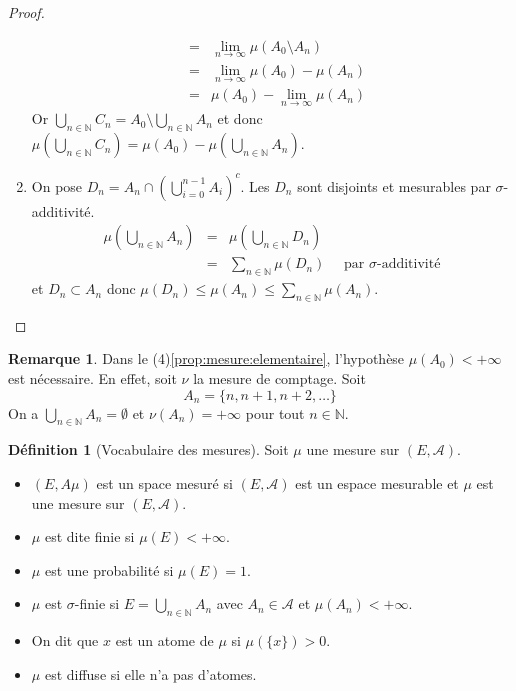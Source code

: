 \documentclass{article}
\theoremstyle{definition}
\newtheorem{definition}{Définition}
\theoremstyle{definition}
\theoremstyle{definition}
\theoremstyle{definition}
\theoremstyle{plain}
\theoremstyle{definition}
\newtheorem{remarque}{Remarque}
\begin{document}
\begin{proof}
\begin{enumerate}
\begin{eqnarray*}
			      &=& \lim\limits_{n \to \infty} \mu(A_0\setminus A_n) \\
			      &=& \lim\limits_{n \to \infty} \mu(A_0) - \mu(A_n) \\
			      &=& \mu(A_0) - \lim\limits_{n \to \infty} \mu(A_n)
		      \end{eqnarray*}
		      Or $\bigcup\limits_{n \in \mathbb{N}} C_n = A_0 \setminus \bigcup\limits_{n \in \mathbb{N}} A_n$ et donc
		      $\mu(\bigcup\limits_{n \in \mathbb{N}} C_n) = \mu(A_0) - \mu(\bigcup\limits_{n \in \mathbb{N}} A_n)$.
		\item On pose $D_n = A_n \cap \left( \bigcup\limits_{i=0}^{n-1} A_i \right)^c$. Les $D_n$ sont disjoints et mesurables par
		      $\sigma$-additivité.
		      \begin{eqnarray*}
			      \mu(\bigcup\limits_{n \in \mathbb{N}} A_n) &=& \mu(\bigcup\limits_{n \in \mathbb{N}} D_n) \\
			      &=& \sum\limits_{n \in \mathbb{N}} \mu(D_n) \quad \text{ par } \sigma\text{-additivité}
		      \end{eqnarray*}
		      et $D_n \subset A_n$ donc $\mu(D_n) \leq \mu(A_n) \leq \sum\limits_{n \in \mathbb{N}} \mu(A_n)$.
	\end{enumerate}
\end{proof}

\begin{remarque}
	Dans le (4)\ref{prop:mesure:elementaire}, l'hypothèse $\mu(A_0) < +\infty$ est nécessaire. En effet, soit
	$\nu$ la mesure de comptage. Soit
	\[ A_n = \{ n, n+1, n+2, \dots \} \]
	On a $\bigcup\limits_{n \in \mathbb{N}} A_n = \emptyset$ et $\nu(A_n) = +\infty$ pour tout $n \in \mathbb{N}$.
\end{remarque}

\begin{definition}[Vocabulaire des mesures]
	Soit $\mu$ une mesure sur $(E, \mathscr{A})$.
	\begin{itemize}
		\item $(E,A\mu)$ est un space mesuré si $(E,\mathscr{A})$ est un espace mesurable et $\mu$ est une mesure sur $ (E, \mathscr{A} ) $.
		\item $\mu$ est dite finie si $\mu(E) < +\infty$.
		\item $\mu$ est une probabilité si $\mu(E) = 1$.
		\item $\mu$ est $\sigma$-finie si $E = \bigcup\limits_{n \in \mathbb{N}} A_n$ avec $A_n \in \mathscr{A}$ et $\mu(A_n) < +\infty$.
		\item On dit que $x$ est un atome de $\mu$ si $\mu(\{x\}) > 0$.
		\item $\mu$ est diffuse si elle n'a pas d'atomes.
	\end{itemize}
\end{definition}
\end{document}
